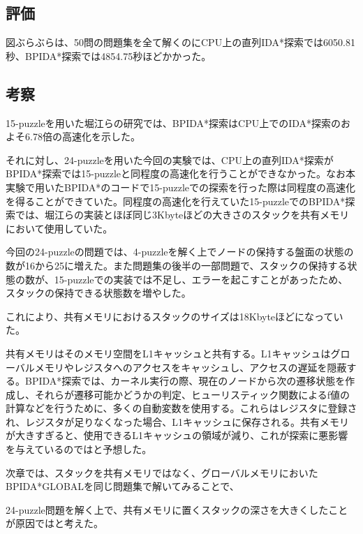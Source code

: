 \documentclass[a4paper,11pt,oneside,openany]{jsbook}
\begin{document}
\subsection{評価}
図ぶらぶらは、50問の問題集を全て解くのにCPU上の直列IDA*探索では6050.81秒、BPIDA*探索では4854.75秒ほどかかった。


\subsection{考察}
15-puzzleを用いた堀江らの研究では、BPIDA*探索はCPU上でのIDA*探索のおよそ6.78倍の高速化を示した。

それに対し、24-puzzleを用いた今回の実験では、CPU上の直列IDA*探索がBPIDA*探索では15-puzzleと同程度の高速化を行うことができなかった。なお本実験で用いたBPIDA*のコードで15-puzzleでの探索を行った際は同程度の高速化を得ることができていた。同程度の高速化を行えていた15-puzzleでのBPIDA*探索では、堀江らの実装とほぼ同じ3Kbyteほどの大きさのスタックを共有メモリにおいて使用していた。

今回の24-puzzleの問題では、4-puzzleを解く上でノードの保持する盤面の状態の数が16から25に増えた。また問題集の後半の一部問題で、スタックの保持する状態の数が、15-puzzleでの実装では不足し、エラーを起こすことがあったため、スタックの保持できる状態数を増やした。

これにより、共有メモリにおけるスタックのサイズは18Kbyteほどになっていた。

共有メモリはそのメモリ空間をL1キャッシュと共有する。L1キャッシュはグローバルメモリやレジスタへのアクセスをキャッシュし、アクセスの遅延を隠蔽する。BPIDA*探索では、カーネル実行の際、現在のノードから次の遷移状態を作成し、それらが遷移可能かどうかの判定、ヒューリスティック関数によるf値の計算などを行うために、多くの自動変数を使用する。これらはレジスタに登録され、レジスタが足りなくなった場合、L1キャッシュに保存される。共有メモリが大きすぎると、使用できるL1キャッシュの領域が減り、これが探索に悪影響を与えているのではと予想した。

次章では、スタックを共有メモリではなく、グローバルメモリにおいたBPIDA*GLOBALを同じ問題集で解いてみることで、





24-puzzle問題を解く上で、共有メモリに置くスタックの深さを大きくしたことが原因ではと考えた。
\end{document}
